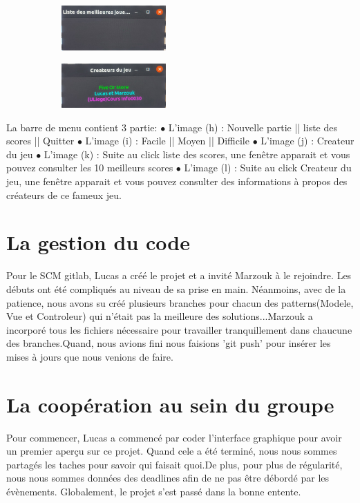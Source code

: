 \documentclass[a4paper, 11pt, oneside]{article}
\begin{document}
\begin{figure}[!h]
    \centering
    \begin{subfigure}[]{}
        \includegraphics[width=4cm]{./images/liste_score.jpg}
    \end{subfigure}
    \begin{subfigure}[]{}
        \includegraphics[width=4cm]{./images/createur2.jpg}
    \end{subfigure}
\end{figure}
La barre de menu contient 3 partie:
\newline
$\bullet$ L'image (h) : Nouvelle partie || liste des scores || Quitter
\newline
$\bullet$ L'image (i) : Facile || Moyen || Difficile
\newline
$\bullet$ L'image (j) : Createur du jeu 
\newline
$\bullet$ L'image (k) : Suite au click liste des scores, une fenêtre apparait et vous pouvez consulter les 10 meilleurs scores
\newline
$\bullet$ L'image (l) : Suite au click Createur du jeu, une fenêtre apparait et vous pouvez consulter des informations à propos des créateurs de ce fameux jeu.

\section{La gestion du code}
Pour le SCM gitlab, Lucas a créé le projet et a invité Marzouk à le rejoindre. Les débuts ont été compliqués au niveau de sa prise en main. Néanmoins, avec de la patience, nous avons su créé plusieurs branches pour chacun des patterns(Modele, Vue et Controleur) qui n'était pas la meilleure des solutions...Marzouk a incorporé tous les fichiers nécessaire pour travailler tranquillement dans chaucune des branches.Quand, nous avions fini
nous faisions 'git push' pour insérer les mises à jours que nous venions de faire.

\section{La coopération au sein du groupe}
Pour commencer, Lucas a commencé par coder l'interface graphique pour avoir un premier aperçu sur ce projet. Quand cele a été terminé, nous nous sommes partagés les taches pour savoir qui faisait quoi.De plus, pour plus de régularité, nous nous sommes données des deadlines afin de ne pas être débordé par les évènements.
Globalement, le projet s'est passé dans la bonne entente.
\end{document}
